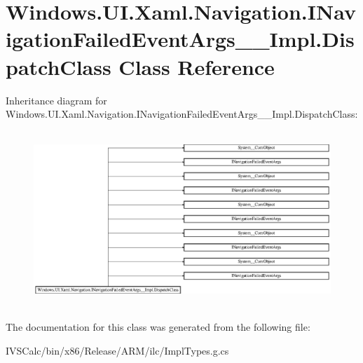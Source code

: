 \hypertarget{class_windows_1_1_u_i_1_1_xaml_1_1_navigation_1_1_i_navigation_failed_event_args_____impl_1_1_dispatch_class}{}\section{Windows.\+U\+I.\+Xaml.\+Navigation.\+I\+Navigation\+Failed\+Event\+Args\+\_\+\+\_\+\+Impl.\+Dispatch\+Class Class Reference}
\label{class_windows_1_1_u_i_1_1_xaml_1_1_navigation_1_1_i_navigation_failed_event_args_____impl_1_1_dispatch_class}
Inheritance diagram for Windows.\+U\+I.\+Xaml.\+Navigation.\+I\+Navigation\+Failed\+Event\+Args\+\_\+\+\_\+\+Impl.\+Dispatch\+Class\+:\begin{figure}[H]
\begin{center}
\leavevmode
\includegraphics[height=6.666667cm]{class_windows_1_1_u_i_1_1_xaml_1_1_navigation_1_1_i_navigation_failed_event_args_____impl_1_1_dispatch_class}
\end{center}
\end{figure}


The documentation for this class was generated from the following file\+:\begin{DoxyCompactItemize}
\item 
I\+V\+S\+Calc/bin/x86/\+Release/\+A\+R\+M/ilc/Impl\+Types.\+g.\+cs\end{DoxyCompactItemize}
